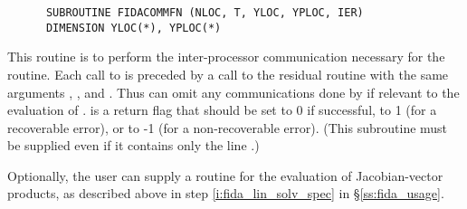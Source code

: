 \begin{Steps}
\begin{verbatim}
      SUBROUTINE FIDACOMMFN (NLOC, T, YLOC, YPLOC, IER)
      DIMENSION YLOC(*), YPLOC(*)
\end{verbatim}
  This routine is to perform the inter-processor communication necessary
  for the  routine.
  Each call to  is preceded by a call to the residual routine
   with the same arguments , , and .
  Thus  can omit any communications done by  if
  relevant to the evaluation of .
   is a return flag that should be set to 0 if successful, to 1
  (for a recoverable error), or to -1 (for a non-recoverable error).
  (This subroutine must be supplied even if it contains only the line .)

  Optionally, the user can supply a routine  for the evaluation of
  Jacobian-vector products, as described above in step \ref{i:fida_lin_solv_spec}
  in \S\ref{ss:fida_usage}.

\end{Steps}
